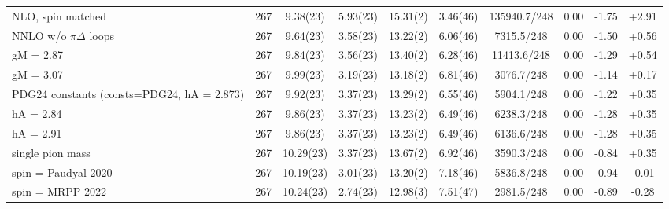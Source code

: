 \begin{tabular}{lccccccccc}
NLO, spin matched & 267 & 9.38(23) & 5.93(23) & 15.31(2) & 3.46(46) & 135940.7/248 & 0.00 & -1.75 & +2.91 \\
NNLO w/o $\pi\Delta$ loops & 267 & 9.64(23) & 3.58(23) & 13.22(2) & 6.06(46) & 7315.5/248 & 0.00 & -1.50 & +0.56 \\
gM = 2.87 & 267 & 9.84(23) & 3.56(23) & 13.40(2) & 6.28(46) & 11413.6/248 & 0.00 & -1.29 & +0.54 \\
gM = 3.07 & 267 & 9.99(23) & 3.19(23) & 13.18(2) & 6.81(46) & 3076.7/248 & 0.00 & -1.14 & +0.17 \\
PDG24 constants (consts=PDG24, hA = 2.873) & 267 & 9.92(23) & 3.37(23) & 13.29(2) & 6.55(46) & 5904.1/248 & 0.00 & -1.22 & +0.35 \\
hA = 2.84 & 267 & 9.86(23) & 3.37(23) & 13.23(2) & 6.49(46) & 6238.3/248 & 0.00 & -1.28 & +0.35 \\
hA = 2.91 & 267 & 9.86(23) & 3.37(23) & 13.23(2) & 6.49(46) & 6136.6/248 & 0.00 & -1.28 & +0.35 \\
single pion mass & 267 & 10.29(23) & 3.37(23) & 13.67(2) & 6.92(46) & 3590.3/248 & 0.00 & -0.84 & +0.35 \\
spin = Paudyal 2020 & 267 & 10.19(23) & 3.01(23) & 13.20(2) & 7.18(46) & 5836.8/248 & 0.00 & -0.94 & -0.01 \\
spin = MRPP 2022 & 267 & 10.24(23) & 2.74(23) & 12.98(3) & 7.51(47) & 2981.5/248 & 0.00 & -0.89 & -0.28 \\
\hline
\end{tabular}

